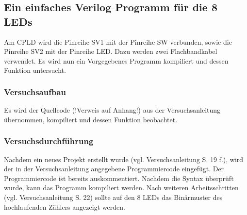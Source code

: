 \documentclass[12pt,a4paper]{article}
\begin{document}
\subsection{Ein einfaches Verilog Programm für die 8 LEDs}
Am CPLD wird die Pinreihe SV1 mit der Pinreihe SW verbunden, sowie die Pinreihe SV2 mit der Pinreihe LED. Dazu werden zwei Flachbandkabel verwendet. Es wird nun ein Vorgegebenes Programm kompiliert und dessen Funktion untersucht.
\subsubsection*{Versuchsaufbau}
Es wird der Quellcode (!Verweis auf Anhang!) aus der Versuchsanleitung übernommen, kompiliert und dessen Funktion beobachtet.
\subsubsection*{Versuchsdurchführung}
Nachdem ein neues Projekt erstellt wurde (vgl. Versuchsanleitung S. 19 f.), wird der in der Versuchsanleitung angegebene Programmiercode eingefügt. Der Programmiercode ist bereits auskommentiert. Nachdem die Syntax überprüft wurde, kann das Programm kompiliert werden. Nach weiteren Arbeitsschritten (vgl. Versuchsanleitung S. 22) sollte auf den 8 LEDs das Binärmuster des hochlaufenden Zählers angezeigt werden.
\end{document}
